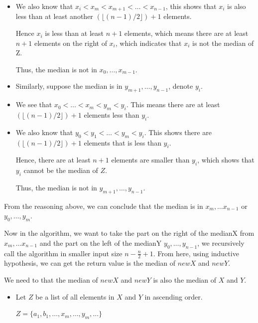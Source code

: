 \documentclass{cpsc413Solutions}
\begin{document}
\begin{problemlist}
\begin{problem}
\begin{enumerate}
\begin{itemize}
\begin{itemize}
        \item We also know that $x_i< x_m < x_{m+1} < \dots < x_{n-1}$, this shows that $x_i$ is also less than at least another $(\lfloor(n-1)/2\rfloor)+1$ elements.
        
        Hence $x_i$ is less than at least $n+1$ elements, which means there are at least $n+1$ elements on the right of $x_i$, which indicates that $x_i$ is not the median of Z.
        
        Thus, the median is not in $x_0, \dots, x_{m-1}$.
        
        \item Similarly, suppose the median is in $y_{m+1}, \dots, y_{n-1}$, denote $y_i$. 
        
        \item We see that $x_0< \dots < x_m < y_m < y_i$. This means there are at least $(\lfloor(n-1)/2\rfloor)+1$ elements less than $y_i$.
        
        \item We also know that $y_0 < y_1 < \dots < y_m < y_i$. This shows there are $(\lfloor(n-1)/2\rfloor)+1$ elements that is less than $y_i$. 
        
        Hence, there are at least $n+1$ elements are smaller than $y_i$, which shows that $y_i$ cannot be the median of $Z$.
        
        Thus, the median is not in $y_{m+1}, \dots, y_{n-1}$.
    \end{itemize}
    
    From the reasoning above, we can conclude that the median is in $x_{m}, \dots x_{n-1}$ or $y_0, \dots, y_m$.
    
    Now in the algorithm, we want to take the part on the right of the medianX from $x_m, \dots x_{n-1}$ and the part on the left of the medianY $y_0, \dots, y_{n-1}$, we recursively call the algorithm in smaller input size $n-\frac{n}{2}+1$. From here, using inductive hypothesis, we can get the return value is the median of $newX$ and $newY$.
    
    We need to that the median of $newX$ and $newY$ is also the median of $X$ and $Y$.
    
    \begin{itemize}
        \item Let $Z$ be a list of all elements in $X$ and $Y$ in ascending order. 
        
        $Z= \{a_1, b_1, \dots , x_m, \dots, y_m, \dots \}$
        

\end{itemize}
\end{itemize}
\end{enumerate}
\end{problem}
\end{problemlist}
\end{document}
